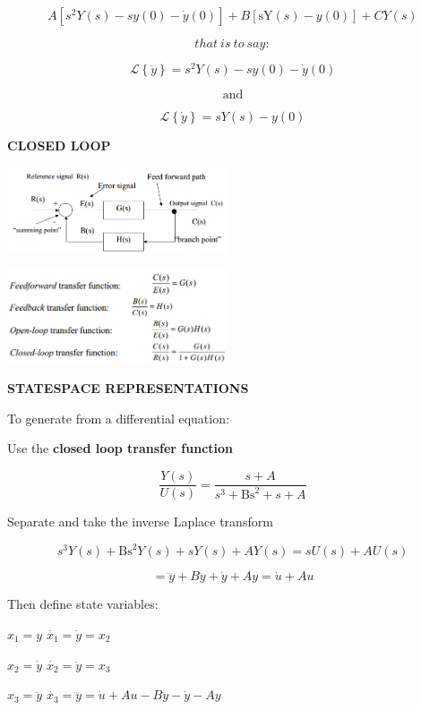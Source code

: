 \documentclass[a0,landscape]{article}
\begin{document}
\begin{multicols}{3}
\[A\left\lbrack s^{2}Y\left( s \right) - sy\left( 0 \right) - \dot{y}\left( 0 \right) \right\rbrack + B\left\lbrack \text{sY}\left( s \right) - y\left( 0 \right) \right\rbrack + CY(s)\]

\[that\ is\ to\ say:\]

\[\mathcal{L}\left\{ \ddot{y} \right\} = s^{2}Y\left( s \right) - sy\left( 0 \right) - \dot{y}(0)\]

\[\text{and}\]

\[\mathcal{L}\left\{ \dot{y} \right\} = sY\left( s \right) - y\left( 0 \right)\]

\textbf{CLOSED LOOP}

\includegraphics[width=2.56442in,height=1.01101in]{media/image6.png}

\includegraphics[width=2.55828in,height=1.07691in]{media/image7.png}

\textbf{STATESPACE REPRESENTATIONS}

To generate from a differential equation:

Use the \textbf{closed loop transfer function}

\[\frac{Y\left( s \right)}{U\left( s \right)} = \frac{s + A}{s^{3} + \text{Bs}^{2} + s + A}\]

Separate and take the inverse Laplace transform

\[s^{3}Y\left( s \right) + \text{Bs}^{2}Y\left( s \right) + sY\left( s \right) + AY\left( s \right) = sU\left( s \right) + AU\left( s \right)\]

\[= \dddot{y} + B\ddot{y} + \dot{y} + Ay = \dot{u} + Au\]

Then define state variables:

\(x_{1} = y\) \(\dot{x_{1}} = \dot{y} = x_{2}\)

\(x_{2} = \dot{y}\) \(\dot{x_{2}} = \ddot{y} = x_{3}\)

\(x_{3} = \ddot{y}\)
\(\dot{x_{3}} = \dddot{y} = \dot{u} + Au - B\ddot{y} - \dot{y} - Ay\)


\end{multicols}
\end{document}
